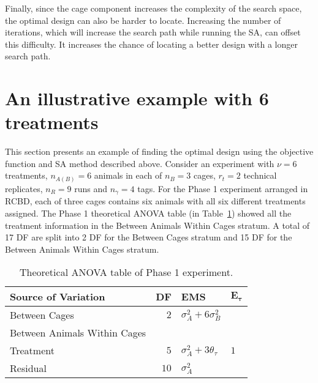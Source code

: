 
Finally, since the cage component increases the complexity of the search space, the optimal design can also be harder to locate. Increasing the number of iterations, which will increase the search path while running the SA, can offset this difficulty. It increases the chance of locating a better design with a longer search path. 

\section{An illustrative example with 6 treatments}
\label{sec:exampleWith6Trt}
This section presents an example of finding the optimal design using the objective function and SA method described above. Consider an experiment with $\nu = 6$ treatments, $n_{A(B)} = 6$ animals in each of  $n_B = 3$ cages, $r_t = 2$ technical replicates, $n_R = 9$ runs and $n_\gamma = 4$ tags. For the Phase 1 experiment arranged in RCBD, each of three cages contains six animals with all six different treatments assigned. The Phase 1 theoretical ANOVA table (in Table~\ref{tab:Phase1ANOVAEX}) showed all the treatment information in the Between Animals Within Cages stratum. A total of 17 DF are split into 2 DF for the Between Cages stratum and 15 DF for the Between Animals Within Cages stratum. 

\begin{table}[ht]
\centering
 \caption{Theoretical ANOVA table of Phase 1 experiment.}
 \begin{tabular}{lrll} 
 \toprule 
 \multicolumn{1}{l}{\textbf{Source of Variation}} & \multicolumn{1}{l}{\textbf{DF}} & \multicolumn{1}{l}{\textbf{EMS}}& \multicolumn{1}{l}{$\bm{E_{\tau}}$}\\ 
 \midrule 
 Between Cages & $2$ & $\sigma_{A}^2+6\sigma_{B}^2$ &\\ \hline
 Between Animals Within Cages &  &  &\\ 
 \quad Treatment & $5$ & $\sigma_{A}^2+3\theta_{\tau}$ &$1$\\ 
 \quad Residual & $10$ & $\sigma_{A}^2$ &\\ 
  \bottomrule 
 \end{tabular} 
 \label{tab:Phase1ANOVAEX} 
\end{table} 

